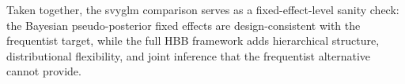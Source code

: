 Taken together, the svyglm comparison serves as a fixed-effect-level
sanity check: the Bayesian pseudo-posterior fixed effects are
design-consistent with the frequentist target, while the full HBB
framework adds hierarchical structure, distributional flexibility,
and joint inference that the frequentist alternative cannot provide.
